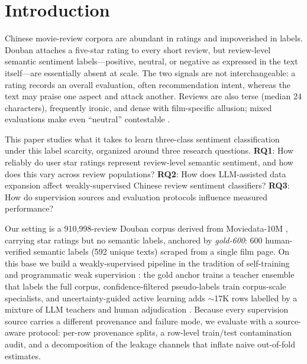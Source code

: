 
\section{Introduction}
\label{sec:intro}

Chinese movie-review corpora are abundant in ratings and impoverished
in labels. Douban attaches a five-star rating to every short review,
but review-level semantic sentiment labels---positive, neutral, or
negative as expressed in the text itself---are essentially absent at
scale. The two signals are not interchangeable: a rating records an
overall evaluation, often recommendation intent, whereas the text may
praise one aspect and attack another. Reviews are also terse (median
24 characters), frequently ironic, and dense with film-specific
allusion; mixed evaluations make even ``neutral'' contestable
\citep{pang2005seeing,zhang2018dl}.

This paper studies what it takes to learn three-class sentiment
classification under this label scarcity, organized around three
research questions. \textbf{RQ1}: How reliably do user star ratings
represent review-level semantic sentiment, and how does this vary
across review populations? \textbf{RQ2}: How does LLM-assisted data
expansion affect weakly-supervised Chinese review sentiment
classifiers? \textbf{RQ3}: How do supervision sources and evaluation
protocols influence measured performance?

Our setting is a 910{,}998-review Douban corpus derived from
Moviedata-10M \citep{moviedata10m}, carrying star ratings but no
semantic labels, anchored by \emph{gold-600}: 600 human-verified
semantic labels (592 unique texts) scraped from a single film page.
On this base we build a weakly-supervised pipeline in the tradition
of self-training and programmatic weak supervision
\citep{lee2013pseudo,xie2020selftraining,ratner2017snorkel}: the gold
anchor trains a teacher ensemble that labels the full corpus,
confidence-filtered pseudo-labels train corpus-scale specialists, and
uncertainty-guided active learning adds $\sim$17K rows labelled by a
mixture of LLM teachers and human adjudication \citep{settles2009}.
Because every supervision source carries a different provenance and
failure mode, we evaluate with a source-aware protocol: per-row
provenance splits, a row-level train/test contamination audit, and a
decomposition of the leakage channels that inflate naive out-of-fold
estimates.

